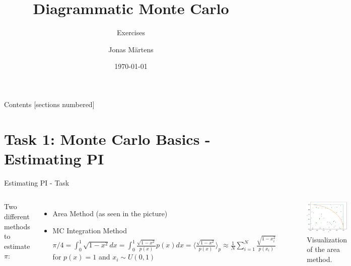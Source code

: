\documentclass[10pt,xcolor=table, aspectratio=1610]{beamer}
\title{Diagrammatic Monte Carlo}
\subtitle{Exercises}
\date{\today}
\author{Jonas Märtens}
\institute{University of Bologna}
\begin{document}
\maketitle

\begin{frame}[containsverbatim]{Contents}
  [sections numbered]
  \tableofcontents%
\end{frame}

\section{Task 1: Monte Carlo Basics - Estimating PI}

\begin{frame}[containsverbatim]{Estimating PI - Task}
\begin{columns}
          Two different methods to estimate $\pi$:
          \begin{itemize}
            \item \alert{Area Method} (as seen in the picture)
            \item \alert{MC Integration Method}
                  $\pi/4=\int_0^1\sqrt{1-x^2}dx=\int_0^1\frac{\sqrt{1-x^2}}{p(x)}p(x)dx=\langle \frac{\sqrt{1-x^2}}{p(x)}\rangle_p\approx\frac{1}{N}\sum_{i=1}^{N}\frac{\sqrt{1-x_i^2}}{p(x_i)}$
                  for $p(x)=1$ and $x_i\sim U(0,1)$
          \end{itemize}
          \begin{figure}
            \centering
            \includegraphics[width=\linewidth]{images/area_method_visualization.png}
            \caption{Visualization of the area method.\cite{tasks}}
          \end{figure}
\end{columns}
\end{frame}
\end{document}
